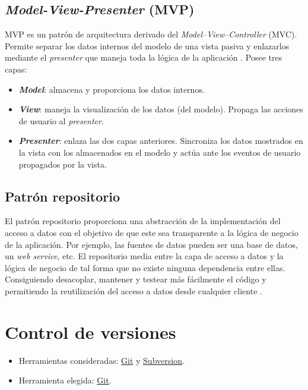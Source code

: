 \subsection{\emph{Model-View-Presenter} (MVP)}\label{model-view-presenter-mvp}

MVP es un patrón de arquitectura derivado del
\emph{Model--View--Controller} (MVC). Permite separar los datos internos
del modelo de una vista pasiva y enlazarlos mediante el \emph{presenter}
que maneja toda la lógica de la aplicación \citep{pattern:mvp}. 
Posee tres capas:

\begin{itemize}
\tightlist
\item
  \textit{\textbf{Model}}: almacena y proporciona los datos internos.
\item
  \textit{\textbf{View}}: maneja la visualización de los datos (del modelo).
  Propaga las acciones de usuario al \emph{presenter}.
\item
  \textit{\textbf{Presenter}}: enlaza las dos capas anteriores. Sincroniza los
  datos mostrados en la vista con los almacenados en el modelo y actúa
  ante los eventos de usuario propagados por la vista.
\end{itemize}


\subsection{Patrón repositorio}\label{patron-repositorio}

El patrón repositorio proporciona una abstracción de la implementación
del acceso a datos con el objetivo de que este sea transparente a la
lógica de negocio de la aplicación. Por ejemplo, las fuentes de datos
pueden ser una base de datos, un \emph{web service}, etc. El repositorio
media entre la capa de acceso a datos y la lógica de negocio de tal
forma que no existe ninguna dependencia entre ellas. Consiguiendo
desacoplar, mantener y testear más fácilmente el código y permitiendo la
reutilización del acceso a datos desde cualquier cliente \citep{pattern:repository}.


\section{Control de versiones}\label{control-de-versiones}

\begin{itemize}
\tightlist
\item
  Herramientas consideradas: \href{https://git-scm.com/}{Git} y
  \href{https://subversion.apache.org/}{Subversion}.
\item
  Herramienta elegida: \href{https://git-scm.com/}{Git}.
\end{itemize}

